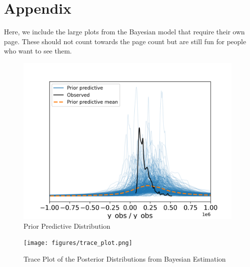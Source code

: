\documentclass[11pt]{amsart}
\begin{document}
\FloatBarrier %
\newpage



\newpage
\section{Appendix}
Here, we include the large plots from the Bayesian model that require their own page.
These should not count towards the page count but are still fun for people who want to see them.

\begin{figure}[hbtp]
        \centering
        \includegraphics[width=0.75\linewidth]{figures/prior_predictive_samples.png}
        \caption{Prior Predictive Distribution}
        \label{fig:ppd}
    \end{figure}

\begin{figure}[hbtp]
        \centering
        \texttt{[image: figures/trace\_plot.png]}
        \caption{Trace Plot of the Posterior Distributions from Bayesian Estimation}
        \label{fig:trace_plot}
\end{figure}
\end{document}
